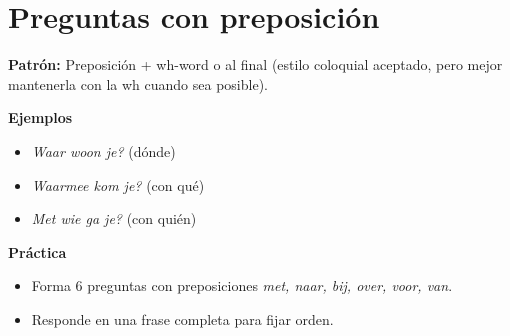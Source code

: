 \section{Preguntas con preposición}
\textbf{Patrón:} Preposición + wh-word o al final (estilo coloquial aceptado, pero mejor mantenerla con la wh cuando sea posible).

\textbf{Ejemplos}
\begin{itemize}[leftmargin=*]
  \item \textit{Waar woon je?} (dónde)
  \item \textit{Waarmee kom je?} (con qué)
  \item \textit{Met wie ga je?} (con quién)
\end{itemize}

\textbf{Práctica}
\begin{itemize}[leftmargin=*]
  \item Forma 6 preguntas con preposiciones \textit{met, naar, bij, over, voor, van}.
  \item Responde en una frase completa para fijar orden.
\end{itemize}
